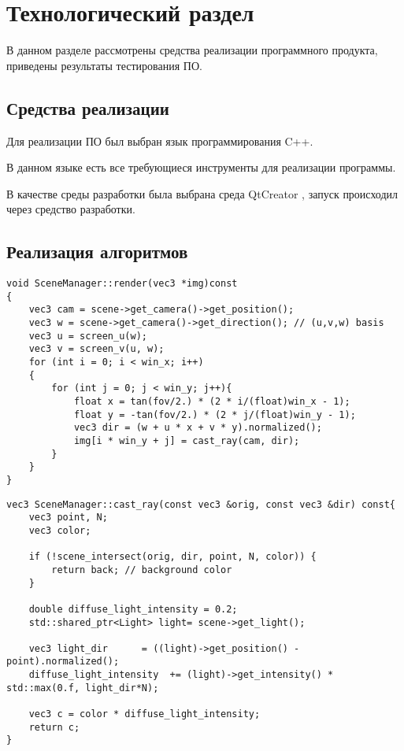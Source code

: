 \chapter{Технологический раздел}
В данном разделе рассмотрены средства реализации программного продукта, приведены результаты тестирования ПО.


\section{Средства реализации} 
Для реализации ПО был выбран язык программирования C++\cite{cpp}. 

В данном языке есть все требующиеся инструменты для реализации программы.

В качестве среды разработки была выбрана среда QtCreator \cite{qtcreator}, запуск происходил через средство разработки.

\section{Реализация алгоритмов}

	
	\begin{lstlisting}[caption=Внешняя функция запуска процесса отрисовки]
void SceneManager::render(vec3 *img)const
{
	vec3 cam = scene->get_camera()->get_position();
	vec3 w = scene->get_camera()->get_direction(); // (u,v,w) basis
	vec3 u = screen_u(w);
	vec3 v = screen_v(u, w);
	for (int i = 0; i < win_x; i++)
	{
		for (int j = 0; j < win_y; j++){
			float x = tan(fov/2.) * (2 * i/(float)win_x - 1);
			float y = -tan(fov/2.) * (2 * j/(float)win_y - 1);
			vec3 dir = (w + u * x + v * y).normalized();
			img[i * win_y + j] = cast_ray(cam, dir);
		}
	}
}
	\end{lstlisting}

\begin{lstlisting}[caption=Функция испускания одного луча]
vec3 SceneManager::cast_ray(const vec3 &orig, const vec3 &dir) const{
	vec3 point, N;
	vec3 color;
	
	if (!scene_intersect(orig, dir, point, N, color)) {
		return back; // background color
	}
	
	double diffuse_light_intensity = 0.2;
	std::shared_ptr<Light> light= scene->get_light();
	
	vec3 light_dir      = ((light)->get_position() - point).normalized();
	diffuse_light_intensity  += (light)->get_intensity() * std::max(0.f, light_dir*N);
	
	vec3 c = color * diffuse_light_intensity;
	return c;
}
\end{lstlisting}

